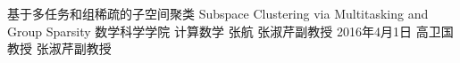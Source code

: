 \documentclass[oneside]{fduthesis}%
\begin{document}
{基于多任务和组稀疏的子空间聚类}%
{Subspace Clustering via Multitasking and Group Sparsity}%
{数学科学学院}%
{计算数学}%
{张\hspace{1em}航}%
{张淑芹\hspace{1.5em}副教授}%
{2016年4月1日}
%
{高卫国\hspace{1.5em}教\hspace{1em}授}
{张淑芹\hspace{1.5em}副教授}

\frontmatter
\tableofcontents


\mainmatter







%

\backmatter



\makebackcover
\end{document}
